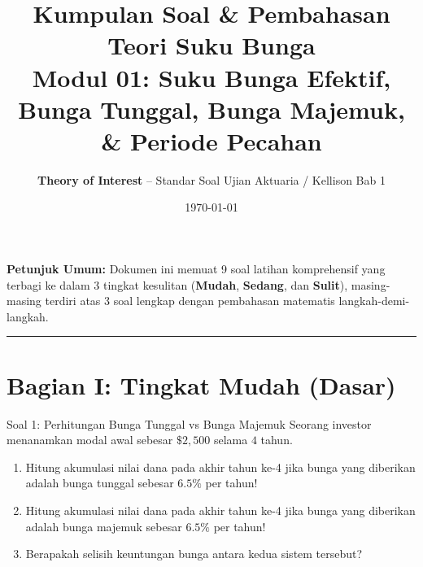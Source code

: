 \documentclass[11pt,a4paper]{article}
\title{\textbf{\LARGE Kumpulan Soal \& Pembahasan Teori Suku Bunga}\\[0.4em]
\Large Modul 01: Suku Bunga Efektif, Bunga Tunggal, Bunga Majemuk, \& Periode Pecahan}
\author{\textbf{Theory of Interest} -- Standar Soal Ujian Aktuaria / Kellison Bab 1}
\date{\today}
\begin{document}
\maketitle
\vspace{-0.5em}
\begin{center}
    \small \textbf{Petunjuk Umum:} Dokumen ini memuat 9 soal latihan komprehensif yang terbagi ke dalam 3 tingkat kesulitan (\textbf{Mudah}, \textbf{Sedang}, dan \textbf{Sulit}), masing-masing terdiri atas 3 soal lengkap dengan pembahasan matematis langkah-demi-langkah.
\end{center}
\vspace{0.8em}
\hrule
\vspace{1.5em}

\section*{Bagian I: Tingkat Mudah (Dasar)}

\begin{problembox}{Soal 1: Perhitungan Bunga Tunggal vs Bunga Majemuk}
Seorang investor menanamkan modal awal sebesar $\$2{,}500$ selama $4$ tahun. 
\begin{enumerate}[label=(\alph*)]
    \item Hitung akumulasi nilai dana pada akhir tahun ke-4 jika bunga yang diberikan adalah bunga tunggal sebesar $6.5\%$ per tahun!
    \item Hitung akumulasi nilai dana pada akhir tahun ke-4 jika bunga yang diberikan adalah bunga majemuk sebesar $6.5\%$ per tahun!
    \item Berapakah selisih keuntungan bunga antara kedua sistem tersebut?
\end{enumerate}
\end{problembox}
\end{document}
